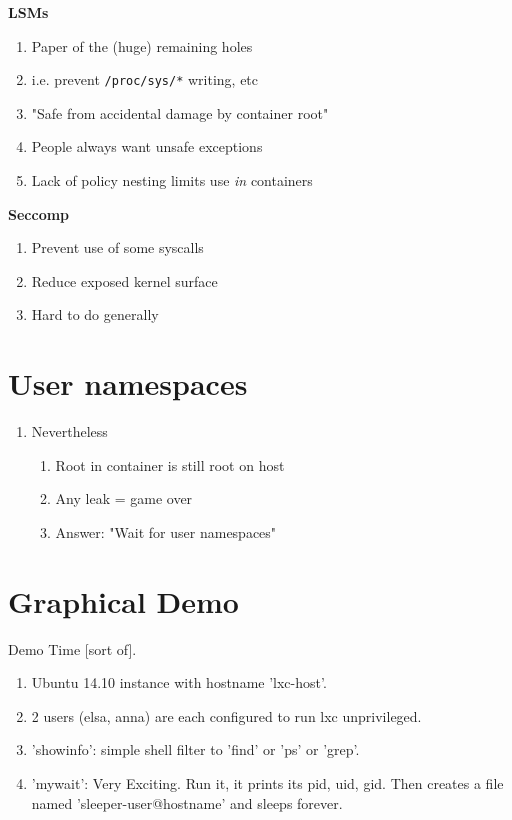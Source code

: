 \documentclass{beamer}
\begin{document}
\begin{frame}
\textbf{LSMs}
\begin{enumerate}
\item Paper of the (huge) remaining holes
\item i.e. prevent {\tt /proc/sys/*} writing, etc
\item "Safe from accidental damage by container root"
\item People always want unsafe exceptions
\item Lack of policy nesting limits use {\em in} containers
\end{enumerate}

\vspace{0.25in}

\textbf{Seccomp}
\begin{enumerate}
\item Prevent use of some syscalls
\item Reduce exposed kernel surface
\item Hard to do generally
\end{enumerate}
\end{frame}

\section{User namespaces}
\begin{frame}
\begin{enumerate}
\item Nevertheless
	\begin{enumerate}
	\item Root in container is still root on host
	\item Any leak = game over
	\item Answer: "Wait for user namespaces"
	\end{enumerate}
\end{enumerate}
\end{frame}

\section{Graphical Demo}
\begin{frame}
Demo Time [sort of].
\begin{enumerate}
   \item Ubuntu 14.10 instance with hostname 'lxc-host'.
   \item 2 users (elsa, anna) are each configured to run lxc unprivileged.
   \item 'showinfo': simple shell filter to 'find' or 'ps' or 'grep'.
   \item 'mywait': Very Exciting. Run it, it prints its pid, uid, gid.  Then creates a file named 'sleeper-user@hostname' and sleeps forever.
\end{enumerate}
\end{frame}
\end{document}
